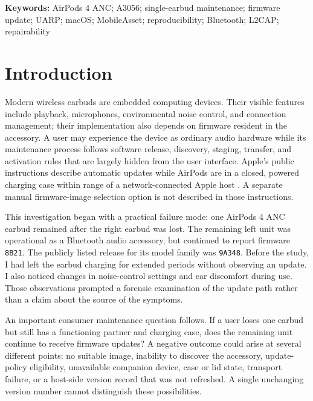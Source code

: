 \documentclass[11pt,letterpaper]{article}
\begin{document}
\begin{abstract}
analysis of a sibling product indicates that case-mediated update completion requires both buds while host-driven staging does not. The study provides a dated, reproducible account of firmware availability, scan initiation, connected-device verification, direct-transport behavior, and the diagnostic evidence needed to resolve this maintenance edge case.
\end{abstract}
\vspace{-0.3em}
\noindent\textbf{Keywords:} AirPods 4 ANC; A3056; single-earbud maintenance; firmware update; UARP; macOS; MobileAsset; reproducibility; Bluetooth; L2CAP; repairability
\medskip

\section{Introduction}\label{sec:introduction}
Modern wireless earbuds are embedded computing devices. Their visible features include playback, microphones, environmental noise control, and connection management; their implementation also depends on firmware resident in the accessory. A user may experience the device as ordinary audio hardware while its maintenance process follows software release, discovery, staging, transfer, and activation rules that are largely hidden from the user interface. Apple's public instructions describe automatic updates while AirPods are in a closed, powered charging case within range of a network-connected Apple host \cite{applefw}. A separate manual firmware-image selection option is not described in those instructions.

This investigation began with a practical failure mode: one AirPods 4 ANC earbud remained after the right earbud was lost. The remaining left unit was operational as a Bluetooth audio accessory, but continued to report firmware \texttt{8B21}. The publicly listed release for its model family was \texttt{9A348}. Before the study, I had left the earbud charging for extended periods without observing an update. I also noticed changes in noise-control settings and ear discomfort during use. Those observations prompted a forensic examination of the update path rather than a claim about the source of the symptoms.

An important consumer maintenance question follows. If a user loses one earbud but still has a functioning partner and charging case, does the remaining unit continue to receive firmware updates? A negative outcome could arise at several different points: no suitable image, inability to discover the accessory, update-policy eligibility, unavailable companion device, case or lid state, transport failure, or a host-side version record that was not refreshed. A single unchanging version number cannot distinguish these possibilities.
\end{document}
